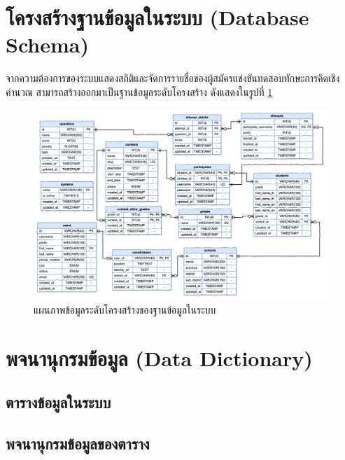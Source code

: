 \section{โครงสร้างฐานข้อมูลในระบบ (Database Schema)}

จากความต้องการของระบบแสดงสถิติและจัดการรายชื่อของผู้สมัครแข่งขันทดสอบทักษะการคิดเชิงคำนวณ สามารถสร้างออกมาเป็นฐานข้อมูลระดับโครงสร้าง ดังแสดงในรูปที่ \ref{fig:physical-database-diagram}

\begin{figure}[H]
    \centering
    \includegraphics[width=120mm,scale=1.0]{diagrams/database.png}
    \caption{แผนภาพข้อมูลระดับโครงสร้างของฐานข้อมูลในระบบ}
    \label{fig:physical-database-diagram}
\end{figure}

\newpage

\section{พจนานุกรมข้อมูล (Data Dictionary)}

\subsection{ตารางข้อมูลในระบบ}


\subsection{พจนานุกรมข้อมูลของตาราง}













